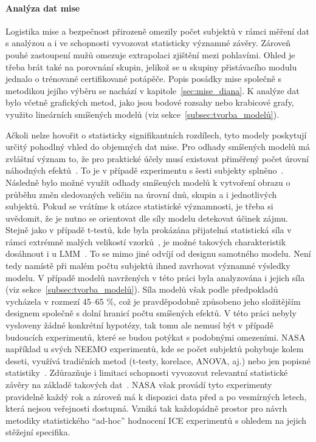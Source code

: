 \paragraph{Analýza dat mise}
Logistika mise a bezpečnost přirozeně omezily počet subjektů v rámci měření dat
s analýzou a i ve schopnosti vyvozovat statisticky významné závěry. Zároveň
pouhé zastoupení mužů omezuje extrapolaci zjištění mezi pohlavími. Ohled je
třeba brát také na porovnání skupin, jelikož se u skupiny přistávacího modulu
jednalo o trénované certifikované potápěče. Popis posádky mise společně s
metodikou jejího výběru se nachází v kapitole~\ref{sec:mise_diana}. K analýze
dat bylo včetně grafických metod, jako jsou bodové rozsahy nebo krabicové grafy,
využito lineárních smíšených modelů (viz sekce~\ref{subsec:tvorba_modelů}).

Ačkoli nelze hovořit o statisticky signifikantních rozdílech, tyto modely
poskytují určitý pohodlný vhled do objemných dat mise. Pro odhady smíšených
modelů má zvláštní význam to, že pro praktické účely musí existovat přiměřený
počet úrovní náhodných efektů~\cite{Clark2015}. To je v případě experimentu s
šesti subjekty splněno~\cite{Gomes2022}. Následně bylo možné využít odhady
smíšených modelů k vytvoření obrazu o průběhu změn sledovaných veličin na úrovní
dnů, skupin a i jednotlivých subjektů. Pokud se vrátíme k otázce statistické
významnosti, je třeba si uvědomit, že je nutno se orientovat dle síly modelu
detekovat účinek zájmu. Stejně jako v případě t-testů, kde byla prokázána
přijatelná statistická síla v rámci extrémně malých velikostí
vzorků~\cite{Winter2013}, je možné takových charakteristik dosáhnout i u
\gls{LMM}~\cite{Muth2016}. To se mimo jiné odvíjí od designu samotného modelu.
Není tedy namístě při malém počtu subjektů ihned zavrhovat významné výsledky
modelu. V případě modelů navržených v této práci byla analyzována i jejich síla
(viz sekce~\ref{subsec:tvorba_modelů}). Síla modelů však podle předpokladů
vycházela v rozmezí 45--65 \%, což je pravděpodobně způsobeno jeho složitějším
designem společně s dolní hranicí počtu smíšených efektů. V této práci nebyly
vysloveny žádné konkrétní hypotézy, tak tomu ale nemusí být v případě budoucích
experimentů, které se budou potýkat s podobnými omezeními. \gls{NASA} například
u svých \gls{NEEMO} experimentů, kde se počet subjektů pohybuje kolem deseti,
využívá tradičních metod (t-testy, korelace, ANOVA, aj.) nebo jen popisné
statistiky~\cite{koutnik2021neemo,Chappell2013}. Zdůrazňuje i limitaci
schopnosti vyvozovat relevantní statistické závěry na základě takových
dat~\cite{koutnik2021neemo}. \gls{NASA} však provádí tyto experimenty pravidelně
každý rok a zároveň má k dispozici data před a po vesmírných letech, která
nejsou veřejnosti dostupná. Vzniká tak každopádně prostor pro návrh metodiky
statistického \enquote{ad-hoc} hodnocení \gls{ICE} experimentů s ohledem na
jejich stěžejní specifika.

